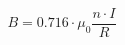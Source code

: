 \begin{equation*}
B = 0.716 \cdot \mu_0 \frac{n \cdot I}{R} 
\tag{242.5} \label{eq:242.5}
\end{equation*}